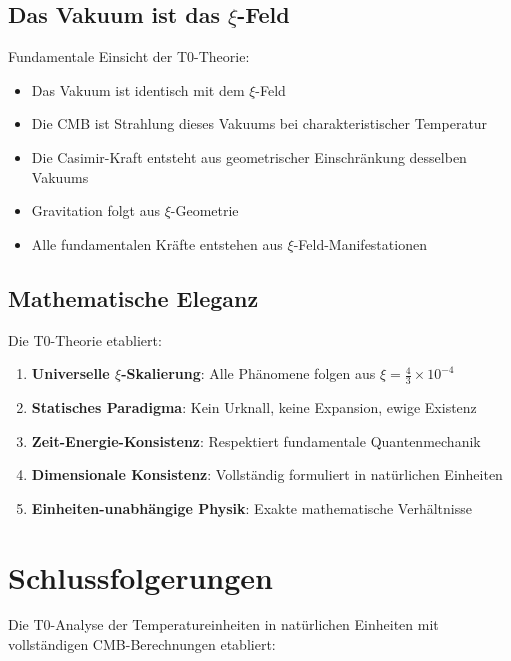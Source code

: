 	\subsection{Das Vakuum ist das $\xi$-Feld}
	
	\begin{important}
		Fundamentale Einsicht der T0-Theorie:
		\begin{itemize}
			\item Das Vakuum ist identisch mit dem $\xi$-Feld
			\item Die CMB ist Strahlung dieses Vakuums bei charakteristischer Temperatur
			\item Die Casimir-Kraft entsteht aus geometrischer Einschränkung desselben Vakuums
			\item Gravitation folgt aus $\xi$-Geometrie
			\item Alle fundamentalen Kräfte entstehen aus $\xi$-Feld-Manifestationen
		\end{itemize}
	\end{important}
	
	\subsection{Mathematische Eleganz}
	
	Die T0-Theorie etabliert:
	\begin{enumerate}
		\item \textbf{Universelle $\xi$-Skalierung}: Alle Phänomene folgen aus $\xi = \frac{4}{3} \times 10^{-4}$
		\item \textbf{Statisches Paradigma}: Kein Urknall, keine Expansion, ewige Existenz
		\item \textbf{Zeit-Energie-Konsistenz}: Respektiert fundamentale Quantenmechanik
		\item \textbf{Dimensionale Konsistenz}: Vollständig formuliert in natürlichen Einheiten
		\item \textbf{Einheiten-unabhängige Physik}: Exakte mathematische Verhältnisse
	\end{enumerate}
	
	\section{Schlussfolgerungen}
	
	Die T0-Analyse der Temperatureinheiten in natürlichen Einheiten mit vollständigen CMB-Berechnungen etabliert:
	
